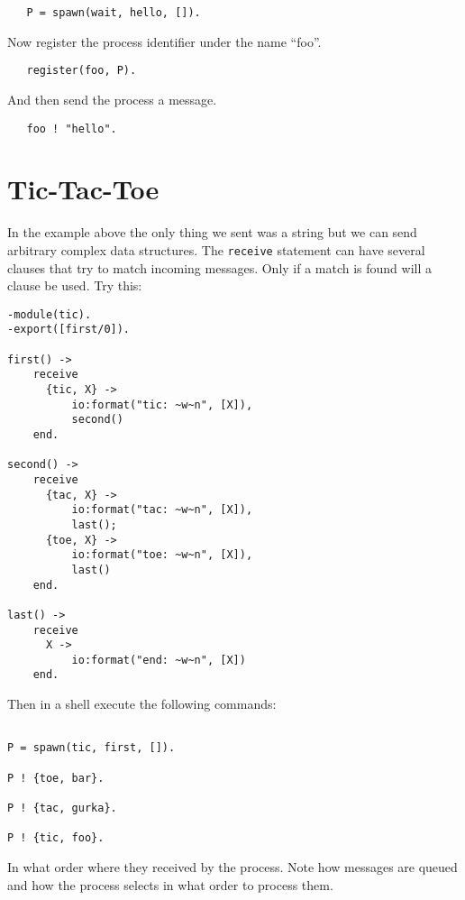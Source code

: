 \documentclass[a4paper,11pt]{article}
\newcommand{\nnsection}[1]{
\section*{#1}
\addcontentsline{toc}{section}{#1}
}
\begin{document}
\begin{verbatim}
   P = spawn(wait, hello, []).
\end{verbatim}

\noindent Now register the process identifier under the name ``foo''.

\begin{verbatim}
   register(foo, P).
\end{verbatim}

\noindent And then send the process a message.

\begin{verbatim}
   foo ! "hello".
\end{verbatim}


\nnsection{Tic-Tac-Toe}

\noindent In the example above the only thing we sent was a string but
we can send arbitrary complex data structures. The {\tt receive}
statement can have several clauses that try to match incoming
messages. Only if a match is found will a clause be used. Try this:

\begin{verbatim}
-module(tic).
-export([first/0]).

first() ->
    receive
      {tic, X} -> 
          io:format("tic: ~w~n", [X]),
          second()
    end.

second() ->
    receive
      {tac, X} -> 
          io:format("tac: ~w~n", [X]),
          last();
      {toe, X} -> 
          io:format("toe: ~w~n", [X]),
          last()
    end.

last() ->
    receive 
      X ->
          io:format("end: ~w~n", [X])
    end.
\end{verbatim}


\noindent Then in a shell execute the following commands:

\begin{verbatim}

P = spawn(tic, first, []).

P ! {toe, bar}.

P ! {tac, gurka}.

P ! {tic, foo}.

\end{verbatim}

\noindent In what order where they received by the process. Note how messages
are queued and how the process selects in what order to process them.
\end{document}
